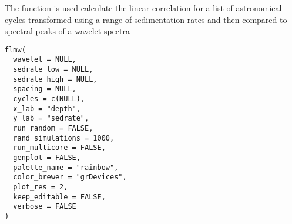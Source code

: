 \documentclass[a4paper]{book}
\begin{document}
%
\begin{Description}
The  function is used calculate the linear correlation
for a list of astronomical cycles transformed using a range of sedimentation rates and then compared
to spectral peaks of a wavelet spectra
\end{Description}
%
\begin{Usage}
\begin{verbatim}
flmw(
  wavelet = NULL,
  sedrate_low = NULL,
  sedrate_high = NULL,
  spacing = NULL,
  cycles = c(NULL),
  x_lab = "depth",
  y_lab = "sedrate",
  run_random = FALSE,
  rand_simulations = 1000,
  run_multicore = FALSE,
  genplot = FALSE,
  palette_name = "rainbow",
  color_brewer = "grDevices",
  plot_res = 2,
  keep_editable = FALSE,
  verbose = FALSE
)
\end{verbatim}
\end{Usage}
%
\end{document}
